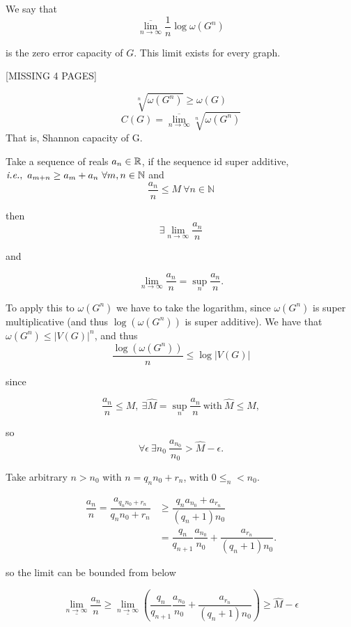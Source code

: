 We say that 
\[
\overline{\lim_{n \rightarrow \infty}}\dfrac{1}{n}\log \omega(G^n)
\]

is the zero error capacity of $G$. This limit exists for every graph.

[MISSING 4 PAGES]



\[
 \sqrt[n]{\omega(G^n)} \geq \omega(G)
\]
\[
 C(G) = \overline{\lim_{n\rightarrow \infty}}\sqrt[n]{\omega(G^n)}
\]
That is, Shannon capacity of G.

\begin{lem}[Fevete]
Take a sequence of reals $a_n \in \mathbb{R}$, if the sequence id super additive, $\textit{i.e.},\ a_{m+n} \geq a_m + a_n\ \forall m, n \in \mathbb{N}$ and
\[
 \dfrac{a_n}{n} \leq M\ \forall n \in \mathbb{N}
\]

then
\[
 \exists \lim_{n \rightarrow \infty}  \dfrac{a_n}{n} 
\]

and

\[
\lim_{n \rightarrow \infty}  \dfrac{a_n}{n} = \sup_n \dfrac{a_n}{n}. 
\]
 
\end{lem}

To apply this to $\omega(G^n)$ we have to take the logarithm, since $\omega(G^n)$ is super multiplicative (and thus $\log(\omega(G^n))$ is super additive). We have that $\omega(G^n) \leq |V(G)|^n$, and thus
\[
 \dfrac{\log(\omega(G^n))}{n} \leq \log|V(G)|
\]

since 

\[
 \dfrac{a_n}{n} \leq M,\ \exists \hat{M} = \sup_n \dfrac{a_n}{n}\ \text{with}\ \hat{M} \leq M,
\]

so
\[
 \forall \epsilon\ \exists n_0\ \dfrac{a_{n_0}}{n_0} > \hat{M} - \epsilon.  
\]

Take arbitrary $n > n_0$ with $n = q_nn_0 +r_n$, with $0 \leq _n < n_0$.

\begin{align*}
 \dfrac{a_n}{n} = \dfrac{a_{q_nn_0 +r_n}}{q_nn_0 +r_n} & \geq \dfrac{q_na_{n_0} +a_{r_n}}{(q_n+1)n_0}\\
 & = \dfrac{q_n}{q_{n+1}} \dfrac{a_{n_0}}{n_0} + \dfrac{a_{r_n}}{(q_n + 1)n_0}.
\end{align*}

so the limit can be bounded from below

\[
 \underline{\lim_{n\rightarrow \infty}} \dfrac{a_n}{n} \geq \underline{\lim_{n\rightarrow \infty}}\left(\dfrac{q_n}{q_{n+1}} \dfrac{a_{n_0}}{n_0} + \dfrac{a_{r_n}}{(q_n + 1)n_0}\right) \geq \hat{M} - \epsilon
\]

